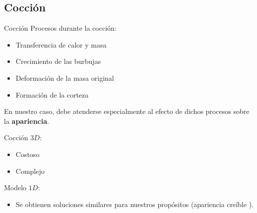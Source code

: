 \documentclass[spanish,unknownkeysallowed,10pt]{beamer}
\begin{document}
\subsection{Cocción}

\begin{frame}{Cocción}
Procesos durante la cocción:

\begin{itemize}
\item Transferencia de calor y masa
\item Crecimiento de las burbujas
\item Deformación de la masa original
\item Formación de la corteza
\end{itemize}

En nuestro caso, debe atenderse especialmente al efecto de dichos procesos sobre la \textbf{apariencia}.



Cocción $3D$:

\begin{itemize}
\item Costoso
\item Complejo
\end{itemize}


Modelo $1D$:

\begin{itemize}
\item Se obtienen soluciones similares para nuestros propósitos (apariencia creíble																																				).
\end{itemize}


%



\end{frame}
\end{document}
